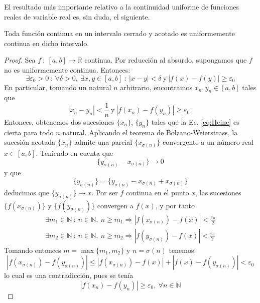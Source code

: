 El resultado más importante relativo a la continuidad uniforme de funciones reales de variable real es, sin duda, el siguiente.
\begin{teo}[de Heine]
    Toda función continua en un intervalo cerrado y acotado es uniformemente continua en dicho intervalo.
\end{teo}
\begin{proof}
    Sea $f ~:~ [a,b] \longrightarrow \mathbb{R}$ continua. Por reducción al absurdo, supongamos que $f$ no es uniformemente continua.
    Entonces:
    \begin{equation*}
        \exists \varepsilon_0 > 0 ~:~ \forall \delta > 0, ~ \exists x,y \in [a,b] ~:~ |x-y| < \delta ~ \text{y} ~ |f(x)-f(y)| \geq \varepsilon_0
    \end{equation*}
    En particular, tomando un natural $n$ arbitrario, encontramos $x_n, y_n \in [a,b]$ tales que
    \begin{equation}\label{eq:Heine}
        |x_n - y_n| < \frac{1}{n} ~ \text{y} ~ |f(x_n)-f(y_n)| \geq \varepsilon_0 ~~
    \end{equation}
    Entonces, obtenemos dos sucesiones $\{x_n\}$, $\{y_n\}$ tales que la Ec. \ref{eq:Heine} es cierta para todo $n$ natural. Aplicando el
    teorema de Bolzano-Weierstrass, la sucesión acotada $\{x_n\}$ admite una parcial $\{x_{\sigma(n)}\}$ convergente
    a un número real $x \in [a,b]$. Teniendo en cuenta que
    \begin{equation*}
        \{y_{\sigma(n)} - x_{\sigma(n)}\} \longrightarrow 0
    \end{equation*}
    y que
    \begin{equation*}
        \{y_{\sigma(n)}\} = \{y_{\sigma(n)} - x_{\sigma(n)} + x_{\sigma(n)}\}
    \end{equation*}
    deducimos que $\{y_{\sigma(n)}\} \longrightarrow x$. Por ser $f$ continua en el punto $x$, las sucesiones
    $\{f(x_{\sigma(n)})\}$ y $\{f(y_{\sigma(n)})\}$ convergen a $f(x)$, y por tanto
    \begin{gather*}
        \exists m_1 \in \mathbb{N} ~:~ n \in \mathbb{N}, ~ n \geq m_1 \Longrightarrow |f(x_{\sigma(n)})-f(x)| < \frac{\varepsilon_0}{2}\\
        \exists m_2 \in \mathbb{N} ~:~ n \in \mathbb{N}, ~ n \geq m_2 \Longrightarrow |f(y_{\sigma(n)})-f(x)| < \frac{\varepsilon_0}{2}
    \end{gather*}
    Tomando entonces $m = \max \{m_1,m_2\}$ y $n = \sigma(n)$ tenemos:
    \begin{equation*}
        |f(x_{\sigma(n)})-f(y_{\sigma(n)})| \leq |f(x_{\sigma(n)})-f(x)| + |f(x)-f(y_{\sigma(n)})| < \varepsilon_0
    \end{equation*}
    lo cual es una contradicción, pues se tenía
    \begin{equation*}
        |f(x_n)-f(y_n)| \geq \varepsilon_0, ~ \forall n \in \mathbb{N}
    \end{equation*}
\end{proof}


